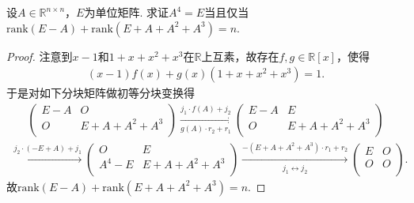 \documentclass[../../main.tex]{subfiles}%
\begin{document}
\begin{example}
设$A \in \mathbb{R}^{n \times n}$，$E$为单位矩阵. 求证$A^4 = E$当且仅当$\text{rank}(E - A) + \text{rank}\left(E + A + A^2 + A^3\right) = n$.
\end{example}
\begin{proof}
注意到$x-1$和$1+x+x^2+x^3$在$\mathbb{R}$上互素，故存在$f,g\in \mathbb{R}[x]$，使得
\begin{align*}
(x-1)f(x) + g(x)(1+x+x^2+x^3) = 1.
\end{align*}
于是对如下分块矩阵做初等分块变换得
\begin{align*}
\left( \begin{matrix}
E-A&		O\\
O&		E+A+A^2+A^3\\
\end{matrix} \right) \xrightarrow[g(A) \cdot r_2+r_1]{j_1 \cdot f(A) +j_2}\left( \begin{matrix}
E-A&		E\\
O&		E+A+A^2+A^3\\
\end{matrix} \right) 
\end{align*}
\begin{align*}
\xrightarrow{j_2 \cdot (-E+A) +j_1}\left( \begin{matrix}
O&		E\\
A^4-E&		E+A+A^2+A^3\\
\end{matrix} \right) \xrightarrow[j_1 \longleftrightarrow j_2]{-(E+A+A^2+A^3) \cdot r_1+r_2}\left( \begin{matrix}
E&		O\\
O&		O\\
\end{matrix} \right).
\end{align*}
故$\text{rank}(E-A) + \text{rank}(E+A+A^2+A^3) = n.$
\end{proof}
\end{document}
